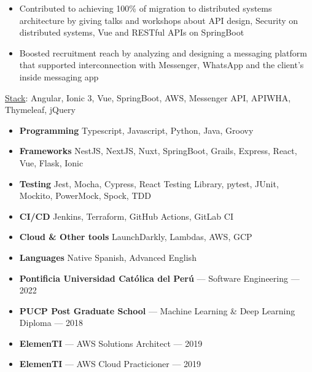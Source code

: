 \documentclass{resume}
\begin{document}
\begin{itemize}[leftmargin=*,itemsep=1ex]
    \begin{itemize}
      \item Contributed to achieving 100\% of migration to distributed systems architecture by giving talks and workshops about API
design, Security on distributed systems, Vue and RESTful APIs on SpringBoot
      \item Boosted recruitment reach by analyzing and designing a messaging platform that supported interconnection with
Messenger, WhatsApp and the client’s inside messaging app
    \end{itemize}
    \underline{Stack}: Angular, Ionic 3, Vue, SpringBoot, AWS, Messenger API, APIWHA, Thymeleaf, jQuery
\end{itemize}

\begin{itemize}[leftmargin=*,itemsep=0cm]
  \item \textbf{Programming} Typescript, Javascript, Python, Java, Groovy
  \item \textbf{Frameworks} NestJS, NextJS, Nuxt, SpringBoot, Grails, Express, React, Vue, Flask, Ionic
  \item \textbf{Testing} Jest, Mocha, Cypress, React Testing Library, pytest, JUnit, Mockito, PowerMock, Spock, TDD
  \item \textbf{CI/CD} Jenkins, Terraform, GitHub Actions, GitLab CI
  \item \textbf{Cloud \& Other tools} LaunchDarkly, Lambdas, AWS, GCP
  \item \textbf{Languages} Native Spanish, Advanced English
\end{itemize}

\begin{itemize}[leftmargin=*,itemsep=0cm]
  \item \textbf{Pontificia Universidad Católica del Perú} --- Software Engineering --- 2022
  \item \textbf{PUCP Post Graduate School} --- Machine Learning \& Deep Learning Diploma --- 2018
  \item \textbf{ElemenTI} --- AWS Solutions Architect --- 2019
  \item \textbf{ElemenTI} --- AWS Cloud Practicioner --- 2019
\end{itemize}
\end{document}
